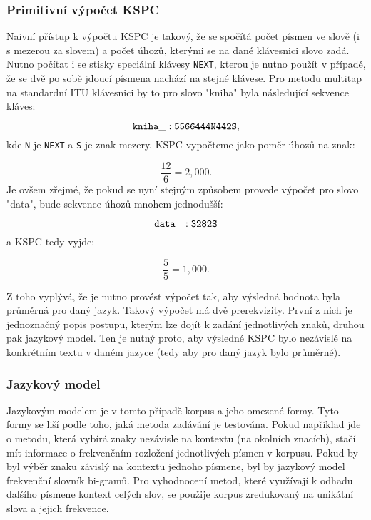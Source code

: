 \documentclass[a4paper,11pt]{article}
\begin{document}
\subsubsection{Primitivní výpočet KSPC}

Naivní přístup k výpočtu KSPC je takový, že se spočítá počet písmen ve slově (i s mezerou za slovem) a počet úhozů, kterými se na dané klávesnici slovo zadá. Nutno počítat i se stisky speciální klávesy {\tt NEXT}, kterou je nutno použít v případě, že se dvě po sobě jdoucí písmena nachází na stejné klávese. \parencite[10]{silfverberg2000predicting} %
Pro metodu multitap na standardní ITU klávesnici by to pro slovo "kniha" byla následující sekvence kláves:

\[
	{\tt kniha\_: 5566444N442S},
\]
kde {\tt N} je {\tt NEXT} a {\tt S} je znak mezery. KSPC vypočteme jako poměr úhozů na znak:

\[
	\frac{12}{6} = 2,000.
\]
Je ovšem zřejmé, že pokud se nyní stejným způsobem provede výpočet pro slovo "data", bude sekvence úhozů mnohem jednodušší:

\[
	{\tt data\_: 3282S}
\]
a KSPC tedy vyjde:

\[
	\frac{5}{5} = 1,000.
\]

Z toho vyplývá, že je nutno provést výpočet tak, aby výsledná hodnota byla průměrná pro daný jazyk. Takový výpočet má dvě prerekvizity. První z nich je jednoznačný popis postupu, kterým lze dojít k zadání jednotlivých znaků, druhou pak jazykový model. Ten je nutný proto, aby výsledné KSPC bylo nezávislé na konkrétním textu v daném jazyce (tedy aby pro daný jazyk bylo průměrné). \parencite[196]{mackenzie2002kspc}

\subsubsection{Jazykový model}

Jazykovým modelem je v tomto případě korpus a jeho omezené formy. Tyto formy se liší podle toho, jaká metoda zadávání je testována. Pokud například jde o metodu, která vybírá znaky nezávisle na kontextu (na okolních znacích), stačí mít informace o frekvenčním rozložení jednotlivých písmen v korpusu. Pokud by byl výběr znaku závislý na kontextu jednoho písmene, byl by jazykový model frekvenční slovník bi-gramů. Pro vyhodnocení metod, které využívají k odhadu dalšího písmene kontext celých slov, se použije korpus zredukovaný na unikátní slova a jejich frekvence.  \parencite[197]{mackenzie2002kspc} %
\end{document}
